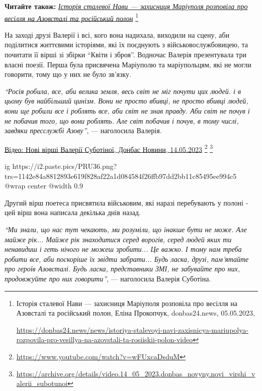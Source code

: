 \textbf{Читайте також:} \href{https://donbas24.news/news/istoriya-stalevoyi-navi-zaxisnicya-mariupolya-rozpovila-pro-vesillya-na-azovstali-ta-rosiiskii-polon-video}{\emph{Історія сталевої Нави — захисниця Маріуполя розповіла про весілля на Азовсталі та російський полон}}%
\footnote{Історія сталевої Нави — захисниця Маріуполя розповіла про весілля на Азовсталі та російський полон, Еліна Прокопчук, donbas24.news, 05.05.2023, \par%
\url{https://donbas24.news/news/istoriya-stalevoyi-navi-zaxisnicya-mariupolya-rozpovila-pro-vesillya-na-azovstali-ta-rosiiskii-polon-video}%
}

На заході друзі Валерії і всі, кого вона надихала, виходили на сцену, аби
поділитися життєвими історіями, які їх поєднують з військовослужбовицею, та
почитати її вірші зі збірки \enquote{Квіти і зброя}. Водночас Валерія презентувала три
власні поезії. Перша була присвячена Маріуполю та маріупольцям, які не могли
говорити, тому що у них не було зв'язку.

\begin{leftbar}
\emph{\enquote{Росія робила, все, аби велика земля, весь світ не міг почути цих людей. і в
цьому був найбільший цинізм. Вони не просто вбивці, не просто вбивці людей,
вони ще робили все і роблять все, аби світ не знав правду. Аби світ не почув
і не побачив того, що вони роблять. Але світ побачив і почув, в тому числі,
завдяки пресслужбі Азову}}, — наголосила Валерія.
\end{leftbar}

\href{https://archive.org/details/video.14_05_2023.donbas_novyny.novi_virshi_valerii_subotunoi}{%
Відео: Нові вірші Валерії Суботіної, Донбас Новини, 14.05.2023}%
\footnote{\url{https://www.youtube.com/watch?v=wFUxcaDsduM}} %
\footnote{\url{https://archive.org/details/video.14_05_2023.donbas_novyny.novi_virshi_valerii_subotunoi}}

\ifcmt
  ig https://i2.paste.pics/PRU36.png?trs=1142e84a8812893e619f828af22a1d084584f26ffb97dd2bb11c85495ee994c5
  @wrap center
  @width 0.9
\fi

Другий вірш поетеса присвятила військовим, які наразі перебувають у полоні -
цей вірш вона написала декілька днів назад.

\begin{leftbar}
\emph{\enquote{Ми знали, що нас тут чекають, ми розуміли, що інакше бути не може. Але
майже рік... Майже рік знаходитися серед ворогів, серед людей яких ти
ненавидиш і геть нічого не можеш зробити... Це важко. І тому нам треба
робити все, аби поскоріше їх звідти забрати... Будь ласка, друзі,
пам'ятайте про героїв Азовсталі. Будь ласка, представники ЗМІ, не
забувайте про них, продовжуйте про них говорити}}, — наголосила Валерія
Суботіна.
\end{leftbar}

